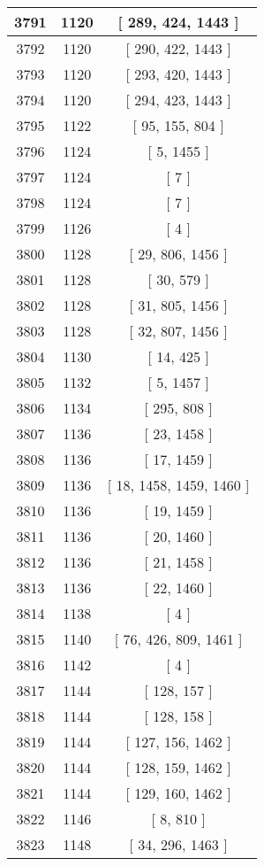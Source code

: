 \begin{center}
\begin{longtable}[H]{|| c c c ||}
\hline
3791 & 1120 & [ 289, 424, 1443 ] \\ 
\hline
3792 & 1120 & [ 290, 422, 1443 ] \\ 
\hline
3793 & 1120 & [ 293, 420, 1443 ] \\ 
\hline
3794 & 1120 & [ 294, 423, 1443 ] \\ 
\hline
3795 & 1122 & [ 95, 155, 804 ] \\ 
\hline
3796 & 1124 & [ 5, 1455 ] \\ 
\hline
3797 & 1124 & [ 7 ] \\ 
\hline
3798 & 1124 & [ 7 ] \\ 
\hline
3799 & 1126 & [ 4 ] \\ 
\hline
3800 & 1128 & [ 29, 806, 1456 ] \\ 
\hline
3801 & 1128 & [ 30, 579 ] \\ 
\hline
3802 & 1128 & [ 31, 805, 1456 ] \\ 
\hline
3803 & 1128 & [ 32, 807, 1456 ] \\ 
\hline
3804 & 1130 & [ 14, 425 ] \\ 
\hline
3805 & 1132 & [ 5, 1457 ] \\ 
\hline
3806 & 1134 & [ 295, 808 ] \\ 
\hline
3807 & 1136 & [ 23, 1458 ] \\ 
\hline
3808 & 1136 & [ 17, 1459 ] \\ 
\hline
3809 & 1136 & [ 18, 1458, 1459, 1460 ] \\ 
\hline
3810 & 1136 & [ 19, 1459 ] \\ 
\hline
3811 & 1136 & [ 20, 1460 ] \\ 
\hline
3812 & 1136 & [ 21, 1458 ] \\ 
\hline
3813 & 1136 & [ 22, 1460 ] \\ 
\hline
3814 & 1138 & [ 4 ] \\ 
\hline
3815 & 1140 & [ 76, 426, 809, 1461 ] \\ 
\hline
3816 & 1142 & [ 4 ] \\ 
\hline
3817 & 1144 & [ 128, 157 ] \\ 
\hline
3818 & 1144 & [ 128, 158 ] \\ 
\hline
3819 & 1144 & [ 127, 156, 1462 ] \\ 
\hline
3820 & 1144 & [ 128, 159, 1462 ] \\ 
\hline
3821 & 1144 & [ 129, 160, 1462 ] \\ 
\hline
3822 & 1146 & [ 8, 810 ] \\ 
\hline
3823 & 1148 & [ 34, 296, 1463 ] \\ 

\end{longtable}
\end{center}
